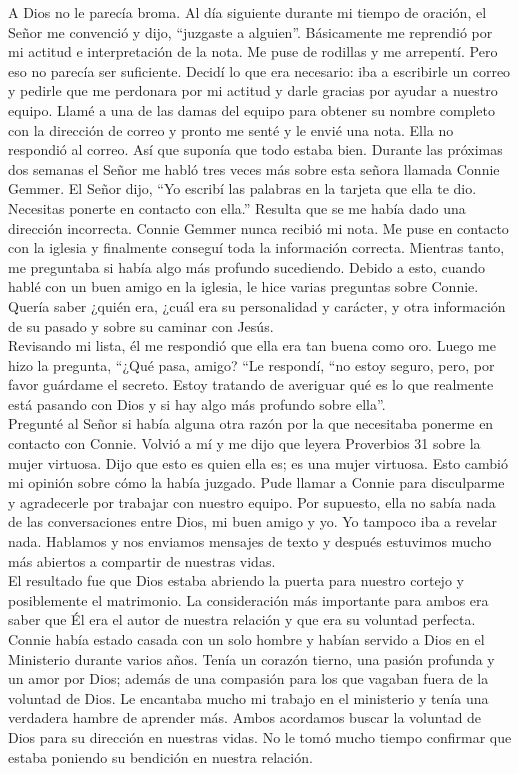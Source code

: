 \documentclass[twoside, 12pt]{book}
\begin{document}
A Dios no le parecía broma.  Al día siguiente durante mi tiempo de oración, el Señor me convenció y dijo, “juzgaste a alguien”. Básicamente me reprendió por mi actitud e interpretación de la nota. Me puse de rodillas y me arrepentí. Pero eso no parecía ser suficiente. Decidí lo que era necesario: iba a escribirle un correo y pedirle que me perdonara por mi actitud y darle gracias por ayudar a nuestro equipo. Llamé a una de las damas del equipo para obtener su nombre completo con la dirección de correo y pronto me senté y le envié una nota. Ella no respondió al correo. Así que suponía que todo estaba bien. Durante las próximas dos semanas el Señor me habló tres veces más sobre esta señora llamada Connie Gemmer.  El Señor dijo, “Yo escribí las palabras en la tarjeta que ella te dio. Necesitas ponerte en contacto con ella.”  Resulta que se me había dado una dirección incorrecta.  Connie Gemmer nunca recibió mi nota. Me puse en contacto con la iglesia y finalmente conseguí toda la información correcta. Mientras tanto, me preguntaba si había algo más profundo sucediendo. Debido a esto, cuando hablé con un buen amigo en la iglesia, le hice varias preguntas sobre Connie. Quería saber ¿quién era, ¿cuál era su personalidad y carácter, y otra información de su pasado y sobre su caminar con Jesús.\\

Revisando mi lista, él me respondió que ella era tan buena como oro.  Luego me hizo la pregunta, “¿Qué pasa, amigo? “Le respondí, “no estoy seguro, pero, por favor guárdame el secreto. Estoy tratando de averiguar qué es lo que realmente está pasando con Dios y si hay algo más profundo sobre ella”.\\

Pregunté al Señor si había alguna otra razón por la que necesitaba ponerme en contacto con Connie. Volvió a mí y me dijo que leyera Proverbios 31 sobre la mujer virtuosa. Dijo que esto es quien ella es; es una mujer virtuosa. Esto cambió mi opinión sobre cómo la había juzgado. Pude llamar a Connie para disculparme y agradecerle por trabajar con nuestro equipo. Por supuesto, ella no sabía nada de las conversaciones entre Dios, mi buen amigo y yo. Yo tampoco iba a revelar nada. Hablamos y nos enviamos mensajes de texto y después estuvimos mucho más abiertos a compartir de nuestras vidas.\\

El resultado fue que Dios estaba abriendo la puerta para nuestro cortejo y posiblemente el matrimonio. La consideración más importante para ambos era saber que Él era el autor de nuestra relación y que era su voluntad perfecta. Connie había estado casada con un solo hombre y habían servido a Dios en el Ministerio durante varios años. Tenía un corazón tierno, una pasión profunda y un amor por Dios; además de una compasión para los que vagaban fuera de la voluntad de Dios. Le encantaba mucho mi trabajo en el ministerio y tenía una verdadera hambre de aprender más.  Ambos acordamos buscar la voluntad de Dios para su dirección en nuestras vidas. No le tomó mucho tiempo confirmar que estaba poniendo su bendición en nuestra relación.\\
\end{document}
